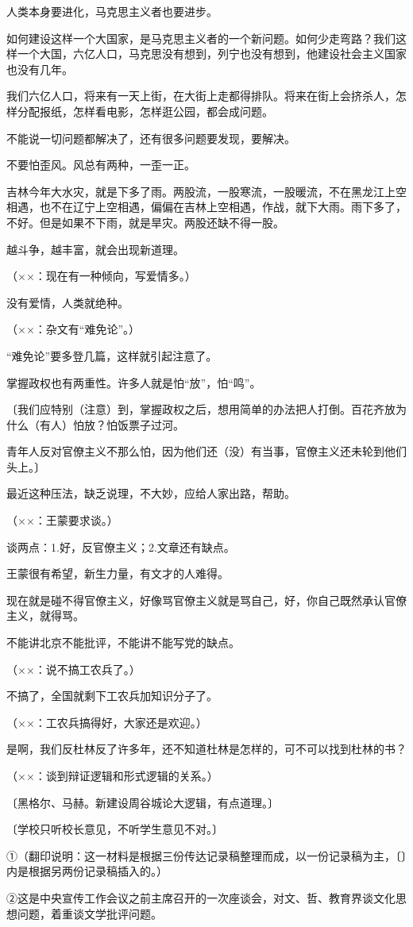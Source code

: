 人类本身要进化，马克思主义者也要进步。

如何建设这样一个大国家，是马克思主义者的一个新问题。如何少走弯路？我们这样一个大国，六亿人口，马克思没有想到，列宁也没有想到，他建设社会主义国家也没有几年。

我们六亿人口，将来有一天上街，在大街上走都得排队。将来在街上会挤杀人，怎样分配报纸，怎样看电影，怎样逛公园，都会成问题。

不能说一切问题都解决了，还有很多问题要发现，要解决。

不要怕歪风。风总有两种，一歪一正。

吉林今年大水灾，就是下多了雨。两股流，一股寒流，一股暖流，不在黑龙江上空相遇，也不在辽宁上空相遇，偏偏在吉林上空相遇，作战，就下大雨。雨下多了，不好。但是如果不下雨，就是旱灾。两股还缺不得一股。

越斗争，越丰富，就会出现新道理。

（××：现在有一种倾向，写爱情多。）

没有爱情，人类就绝种。

（××：杂文有“难免论”。）

“难免论”要多登几篇，这样就引起注意了。

掌握政权也有两重性。许多人就是怕“放”，怕“鸣”。

〔我们应特别（注意）到，掌握政权之后，想用简单的办法把人打倒。百花齐放为什么（有人）怕放？怕饭票子过河。

青年人反对官僚主义不那么怕，因为他们还（没）有当事，官僚主义还未轮到他们头上。〕

最近这种压法，缺乏说理，不大妙，应给人家出路，帮助。

（××：王蒙要求谈。）

谈两点：1.好，反官僚主义；2.文章还有缺点。

王蒙很有希望，新生力量，有文才的人难得。

现在就是碰不得官僚主义，好像骂官僚主义就是骂自己，好，你自己既然承认官僚主义，就得骂。

不能讲北京不能批评，不能讲不能写党的缺点。

（××：说不搞工农兵了。）

不搞了，全国就剩下工农兵加知识分子了。

（××：工农兵搞得好，大家还是欢迎。）

是啊，我们反杜林反了许多年，还不知道杜林是怎样的，可不可以找到杜林的书？

（××：谈到辩证逻辑和形式逻辑的关系。）

〔黑格尔、马赫。新建设周谷城论大逻辑，有点道理。〕

〔学校只听校长意见，不听学生意见不对。〕

①（翻印说明：这一材料是根据三份传达记录稿整理而成，以一份记录稿为主，〔〕内是根据另两份记录稿插入的。）

②这是中央宣传工作会议之前主席召开的一次座谈会，对文、哲、教育界谈文化思想问题，着重谈文学批评问题。


